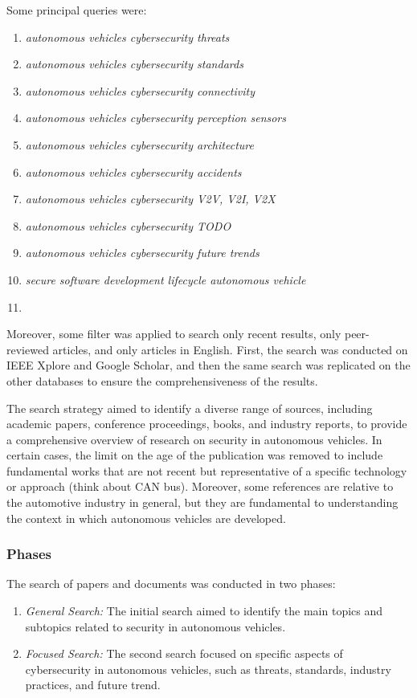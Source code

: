 Some principal queries were:
\begin{enumerate}
    \item \textit{autonomous vehicles cybersecurity threats}
    \item \textit{autonomous vehicles cybersecurity standards}
    \item \textit{autonomous vehicles cybersecurity connectivity}
    \item \textit{autonomous vehicles cybersecurity perception sensors}
    \item \textit{autonomous vehicles cybersecurity architecture}
    \item \textit{autonomous vehicles cybersecurity accidents}
    \item \textit{autonomous vehicles cybersecurity V2V, V2I, V2X}
    \item \textit{autonomous vehicles cybersecurity TODO}
    \item \textit{autonomous vehicles cybersecurity future trends}
    \item \textit{secure software development lifecycle autonomous vehicle}
    \item {}
\end{enumerate}

Moreover, some filter was applied to search only recent results, only peer-reviewed articles, and only articles in English.
First, the search was conducted on IEEE Xplore and Google Scholar, and then the same search was replicated on the other databases to ensure the comprehensiveness of the results.

The search strategy aimed to identify a diverse range of sources, including academic papers, conference proceedings, books, and industry reports, to provide a comprehensive overview of research on security in autonomous vehicles.
In certain cases, the limit on the age of the publication was removed to include fundamental works that are not recent but representative of a specific technology or approach (think about CAN bus).
Moreover, some references are relative to the automotive industry in general, but they are fundamental to understanding the context in which autonomous vehicles are developed.

\subsubsection{Phases}\label{subsubsec:phases}
The search of papers and documents was conducted in two phases:
\begin{enumerate}
    \item \textit{General Search:} The initial search aimed to identify the main topics and subtopics related to security in autonomous vehicles.
    \item \textit{Focused Search:} The second search focused on specific aspects of cybersecurity in autonomous vehicles, such as threats, standards, industry practices, and future trend.
\end{enumerate}

